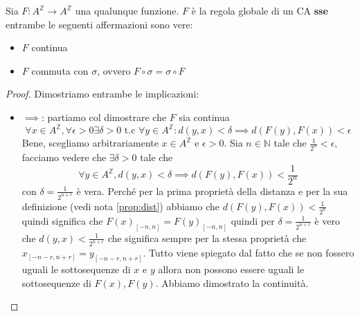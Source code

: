 \begin{teorema}  \label{th:hedlund}
    Sia $F:A^\mathbb{Z}\rightarrow A^\mathbb{Z}$ una qualunque funzione.
    $F$ è la regola globale di un CA \textbf{sse} entrambe le seguenti affermazioni
    sono vere:
    \begin{itemize}
        \item $F$ continua
        \item $F$ commuta con $\sigma$, ovvero $ F\circ\sigma =\sigma \circ F$
    \end{itemize}
    \begin{proof}
        Dimostriamo entrambe le implicazioni:
        \begin{itemize}
            \item $\implies$: partiamo col dimostrare che $F$ sia continua
            $$\forall x \in A^\mathbb{Z}, \forall \epsilon > 0 \exists \delta> 0 \text{ t.c } \forall y \in A^\mathbb{Z}: d(y, x) < \delta \implies d(F(y), F(x))< \epsilon$$
            Bene, scegliamo arbitrariamente $x\in  A^\mathbb{Z}$ e $\epsilon >0$.
            Sia $n\in \mathbb{N}$ tale che $\frac{1}{2^n} < \epsilon $, facciamo vedere
            che $\exists \delta>0$ tale che 
            $$\forall y\in A^\mathbb{Z}, d(y,x) < \delta \implies d(F(y), F(x))< \frac{1}{2^n}$$
            con $\delta=\frac{1}{2^{n+r}}$ è vera. Perché per la prima proprietà 
            della distanza e per la sua definizione (vedi nota \ref{prop:dist}) abbiamo che $d(F(y),F(x)) < \frac{1}{2^{n}}$ 
            quindi significa che $F(x)_{[-n,n]} = F(y)_{[-n,n]}$ quindi per
            $\delta=\frac{1}{2^{n+r}}$ è vero che $d(y,x) < \frac{1}{2^{n+r}}$
            che significa sempre per la stessa proprietà che $x_{[-n-r,n+r]} = y_{[-n-r,n+r]}$.
            Tutto viene spiegato dal fatto che se non fossero uguali le sottosequenze
            di $x$ e $y$ allora non possono essere uguali le sottosequenze di $F(x), F(y)$.
            Abbiamo dimostrato la continuità.


\end{itemize}
\end{proof}
\end{teorema}

